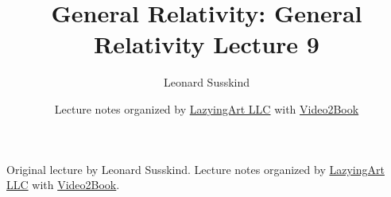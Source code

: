 \documentclass[11pt,oneside]{book}
\begin{document}
\frontmatter
\title{General Relativity: General Relativity Lecture 9}
\author{Leonard Susskind}
\date{Lecture notes organized by \href{https://lazying.art}{LazyingArt LLC} with \href{https://github.com/lachlanchen/Video2Book}{Video2Book}}
\maketitle
\begin{center}
\small Original lecture by Leonard Susskind. Lecture notes organized by \href{https://lazying.art}{LazyingArt LLC} with \href{https://github.com/lachlanchen/Video2Book}{Video2Book}.
\end{center}
\clearpage
\mainmatter

\end{document}
